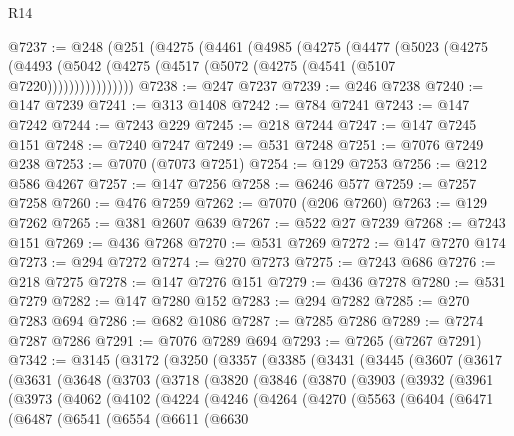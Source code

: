\begin{lexlean}{R14}
\begin{coremodule}
@7237 := @248
    (@251
      (@4275
        (@4461
          (@4985
            (@4275
              (@4477
                (@5023
                  (@4275
                    (@4493 (@5042 (@4275 (@4517 (@5072 (@4275 (@4541 (@5107 @7220))))))))))))))))
@7238 := @247 @7237
@7239 := @246 @7238
@7240 := @147 @7239
@7241 := @313 @1408
@7242 := @784 @7241
@7243 := @147 @7242
@7244 := @7243 @229
@7245 := @218 @7244
@7247 := @147 @7245 @151
@7248 := @7240 @7247
@7249 := @531 @7248
@7251 := @7076 @7249 @238
@7253 := @7070 (@7073 @7251)
@7254 := @129 @7253
@7256 := @212 @586 @4267
@7257 := @147 @7256
@7258 := @6246 @577
@7259 := @7257 @7258
@7260 := @476 @7259
@7262 := @7070 (@206 @7260)
@7263 := @129 @7262
@7265 := @381 @2607 @639
@7267 := @522 @27 @7239
@7268 := @7243 @151
@7269 := @436 @7268
@7270 := @531 @7269
@7272 := @147 @7270 @174
@7273 := @294 @7272
@7274 := @270 @7273
@7275 := @7243 @686
@7276 := @218 @7275
@7278 := @147 @7276 @151
@7279 := @436 @7278
@7280 := @531 @7279
@7282 := @147 @7280 @152
@7283 := @294 @7282
@7285 := @270 @7283 @694
@7286 := @682 @1086
@7287 := @7285 @7286
@7289 := @7274 @7287 @7286
@7291 := @7076 @7289 @694
@7293 := @7265 (@7267 @7291)
@7342 := @3145
    (@3172
      (@3250
        (@3357
          (@3385
            (@3431
              (@3445
                (@3607
                  (@3617
                    (@3631
                      (@3648
                        (@3703
                          (@3718
                            (@3820
                              (@3846
                                (@3870
                                  (@3903
                                    (@3932
                                      (@3961
                                        (@3973
                                          (@4062
                                            (@4102
                                              (@4224
                                                (@4246
                                                  (@4264
                                                    (@4270
                                                      (@5563
                                                        (@6404
                                                          (@6471
                                                            (@6487
                                                              (@6541
                                                                (@6554
                                                                  (@6611
                                                                    (@6630

\end{coremodule}
\end{lexlean}
